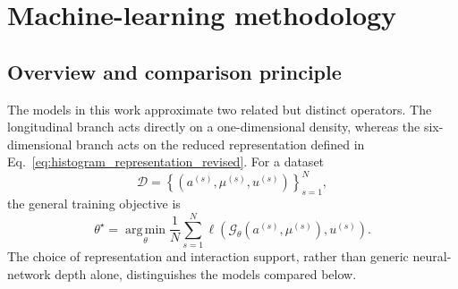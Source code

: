 \section{Machine-learning methodology}
\label{sec:methodology}

\subsection{Overview and comparison principle}
\label{subsec:methodology_overview}

The models in this work approximate two related but distinct operators. The longitudinal branch acts directly on a one-dimensional density, whereas the six-dimensional branch acts on the reduced representation defined in Eq.~\eqref{eq:histogram_representation_revised}. For a dataset
\begin{equation}
    \mathcal{D}
    =
    \left\{
        \left(a^{(s)},\mu^{(s)},u^{(s)}\right)
    \right\}_{s=1}^{N},
\end{equation}
the general training objective is
\begin{equation}
    \theta^{\star}
    =
    \operatorname*{arg\,min}_{\theta}
    \frac{1}{N}
    \sum_{s=1}^{N}
    \ell\!\left(
        \mathcal{G}_{\theta}(a^{(s)},\mu^{(s)}),
        u^{(s)}
    \right).
    \label{eq:operator_training_revised}
\end{equation}
The choice of representation and interaction support, rather than generic neural-network depth alone, distinguishes the models compared below.

